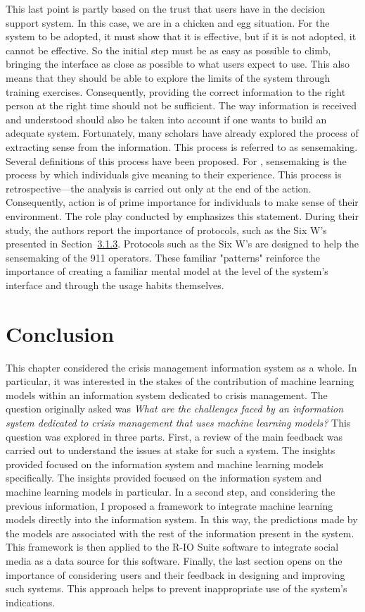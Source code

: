 This last point is partly based on the trust that users have in the decision support system.
In this case, we are in a chicken and egg situation.
For the system to be adopted, it must show that it is effective, but if it is not adopted, it cannot be effective.
So the initial step must be as easy as possible to climb, bringing the interface as close as possible to what users expect to use.
This also means that they should be able to explore the limits of the system through training exercises.
Consequently, providing the correct information to the right person at the right time should not be sufficient.
The way information is received and understood should also be taken into account if one wants to build an adequate system.
Fortunately, many scholars have already explored the process of extracting sense from the information.
This process is referred to as sensemaking.
Several definitions of this process have been proposed.
For \textcite{weickSensemakingOrganizations1995}, sensemaking is the process by which individuals give meaning to their experience.
This process is retrospective—the analysis is carried out only at the end of the action.
Consequently, action is of prime importance for individuals to make sense of their environment.
The role play conducted by \textcite{graceRolePlayingNext2019} emphasizes this statement.
During their study, the authors report the importance of protocols, such as the Six W's presented in Section~\hyperref[sec:sixws]{3.1.3}.
Protocols such as the Six W's are designed to help the sensemaking of the 911 operators.
These familiar "patterns" reinforce the importance of creating a familiar mental model at the level of the system's interface and through the usage habits themselves.

\section*{Conclusion}
This chapter considered the crisis management information system as a whole.
In particular, it was interested in the stakes of the contribution of machine learning models within an information system dedicated to crisis management.
The question originally asked was
\textit{What are the challenges faced by an information system dedicated to crisis management that uses machine learning models?}
This question was explored in three parts.
First, a review of the main feedback was carried out to understand the issues at stake for such a system.
The insights provided focused on the information system and machine learning models specifically.
The insights provided focused on the information system and machine learning models in particular.
In a second step, and considering the previous information, I proposed a framework to integrate machine learning models directly into the information system.
In this way, the predictions made by the models are associated with the rest of the information present in the system.
This framework is then applied to the R-IO Suite software to integrate social media as a data source for this software.
Finally, the last section opens on the importance of considering users and their feedback in designing and improving such systems.
This approach helps to prevent inappropriate use of the system's indications.

